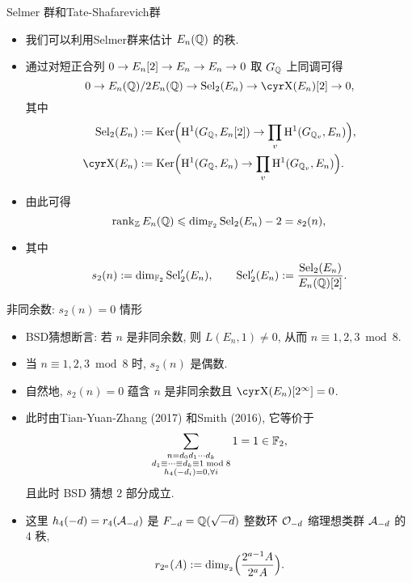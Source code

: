 \documentclass[aspectratio=169]{ctexbeamer}
\begin{document}
\begin{frame}{Selmer 群和Tate-Shafarevich群}
	\begin{itemize}
		\item 我们可以利用Selmer群来估计 $E_n({\mathbb{Q}})$ 的秩.
		\item 通过对短正合列 $0\rightarrow E_n[2]\rightarrow E_n\rightarrow E_n\rightarrow 0$ 取 $G_{\mathbb{Q}}$ 上同调可得
		\[
			0\ra E_n(\BQ)/2E_n(\BQ)\ra \Sel_2(E_n)\ra \Sha(E_n)[2]\ra0,
		\]
		其中
		\begin{align*}
			\Sel_2(E_n)&:=\Ker\Bigl(\RH^1(G_\BQ,E_n[2])\ra\prod_v \RH^1(G_{\BQ_v},E_n)\Bigr),\\
			\Sha(E_n)&:=\Ker\Bigl(\RH^1(G_\BQ,E_n)\ra\prod_v \RH^1(G_{\BQ_v},E_n)\Bigr).
		\end{align*}
		\item 由此可得
		\[
			\operatorname{rank}_{\mathbb{Z}} E_n({\mathbb{Q}})\leqslant \dim_{{\mathbb{F}}_2}{\mathrm{Sel}}_2(E_n)-2=s_2(n),
		\]
		\item 其中
		\[
			s_2(n):=\dim_{{\mathbb{F}}_2}{\mathrm{Sel}}'_2(E_n),\qquad
			{\mathrm{Sel}}'_2(E_n):=\frac{{\mathrm{Sel}}_2(E_n)}{E_n({\mathbb{Q}})[2]}.
		\]
	\end{itemize}
\end{frame}


\begin{frame}{非同余数: $s_2(n)=0$ 情形}
	\begin{itemize}
		\item BSD猜想断言: 若 $n$ 是非同余数, 则 $L(E_n,1)\ne 0$, 从而 $n\equiv 1,2,3\bmod 8$.
		\item 当 $n\equiv 1,2,3\bmod 8$ 时, $s_2(n)$ 是偶数.
		\item 自然地, $s_2(n)=0$ 蕴含 $n$ 是非同余数且 $\Sha(E_n)[2^\infty]=0$.
		\item 此时由Tian-Yuan-Zhang (2017) 和Smith (2016), 它等价于
		\[
			\sum_{\substack{n=d_0d_1\cdots d_k\\ d_1\equiv\dots\equiv d_k\equiv 1\bmod 8\\ h_4(-d_i)=0,\forall i}}1=1\in{\mathbb{F}}_2,
		\]
		且此时 BSD 猜想 $2$ 部分成立.
		\item 这里 $h_4(-d)=r_4({\mathcal{A}}_{-d})$ 是 $F_{-d}={\mathbb{Q}}(\sqrt{-d})$ 整数环 ${\mathcal{O}}_{-d}$ 缩理想类群 ${\mathcal{A}}_{-d}$ 的 $4$ 秩, 
		\[
			r_{2^a}(A):=\dim_{{\mathbb{F}}_2}\Bigl(\frac{2^{a-1} A}{2^a A}\Bigr).
		\]
	\end{itemize}
\end{frame}
\end{document}
